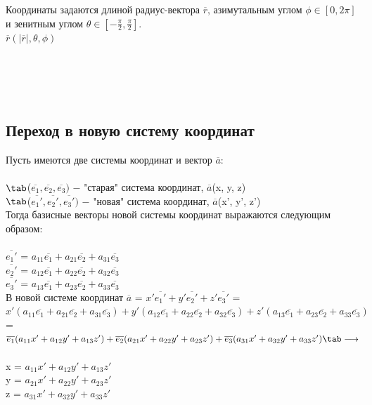 Координаты задаются длиной радиус-вектора $\overline{r}$, азимутальным углом $\phi\in[0, 2\pi]$ и зенитным углом $\theta\in[-\frac{\pi}{2}, \frac{\pi}{2}]$.\\

$\overline{r}(|\overline{r}|, \theta, \phi)$
\tab\\ \tab\\ \tab\\ \tab\\ \tab\\
\newpage

\subsection{Переход в новую систему координат}

Пусть имеются две системы координат и вектор $\overline{a}$:\\
\tab\\
$\tab$($\overline{e_1}, \overline{e_2}, \overline{e_3})$ $-$ "старая" система координат, $\overline{a}$(x, y, z)\\
$\tab$($\overline{e_1'}, \overline{e_2'}, \overline{e_3'})$ $-$ "новая" система координат, $\overline{a}$(x', y', z')\\

Тогда базисные векторы новой системы координат выражаются следующим образом:\\
\tab\\
$\overline{e_1'}$ = $a_{11}\overline{e_1} + a_{21}\overline{e_2} + a_{31}\overline{e_3}$\\
$\overline{e_2'}$ = $a_{12}\overline{e_1} + a_{22}\overline{e_2} + a_{32}\overline{e_3}$\\
$\overline{e_3'}$ = $a_{13}\overline{e_1} + a_{23}\overline{e_2} + a_{33}\overline{e_3}$\\

В новой системе координат $\overline{a}$ = $x'\overline{e_1'} + y'\overline{e_2'} + z'\overline{e_3'}$ = $x'(a_{11}\overline{e_1} + a_{21}\overline{e_2} + a_{31}\overline{e_3}) + y'(a_{12}\overline{e_1} + a_{22}\overline{e_2} + a_{32}\overline{e_3}) + z'(a_{13}\overline{e_1} + a_{23}\overline{e_2} + a_{33}\overline{e_3})$ = $\overline{e_1}(a_{11}x' + a_{12}y' + a_{13}z') + \overline{e_2}(a_{21}x' + a_{22}y' + a_{23}z') + \overline{e_3}(a_{31}x' + a_{32}y' + a_{33}z')\tab\longrightarrow$\\
\tab\\
x = $a_{11}x' + a_{12}y' + a_{13}z'$\\
y = $a_{21}x' + a_{22}y' + a_{23}z'$\\
z = $a_{31}x' + a_{32}y' + a_{33}z'$\\

